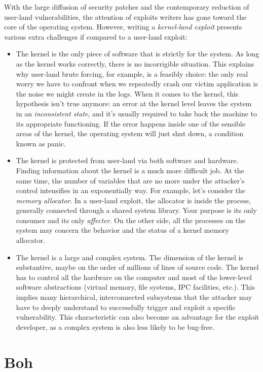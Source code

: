 \documentclass{masterthesis}
\begin{document}
With the large diffusion of security patches and the contemporary reduction of user-land vulnerabilities, the attention of exploits writers has gone toward the core of the operating system.
However, writing a \emph{kernel-land exploit} presents various extra challenges if compared to a user-land exploit:
\begin{itemize}
\item The kernel is the only piece of software that is strictly for the system. As long as the kernel works correctly, there is no incorrigible situation.
This explains why user-land brute forcing, for example, is a feasibly choice: the only real worry we have to confront when we repeatedly crash our victim application is the noise we might create in the logs. 
When it comes to the kernel, this hypothesis isn't true anymore: an error at the kernel level leaves the system in an \emph{inconsistent state}, and it's usually required to take back the machine to its appropriate functioning.
 If the error happens inside one of the sensible areas of the kernel, the operating system will just shut down, a condition known as panic.
\item The kernel is protected from user-land via both software and hardware. Finding information about the kernel is a much more difficult job. At the same time, the number of variables that are no more under the attacker’s control intensifies in an exponentially way. For example, let's consider the \emph{memory allocator}.
In a user-land exploit, the allocator is inside the process, generally connected through a shared system library. Your purpose is its only consumer and its only \emph{affecter}. On the other side, all the processes on the system may concern the behavior and the status of a kernel memory allocator.
\item The kernel is a large and complex system. The dimension of the kernel is substantive, maybe on the order of millions of lines of source code. The kernel has to control all the hardware on the computer and most of the lower-level software
abstractions (virtual memory, file systems, IPC facilities, etc.). This implies many hierarchical, interconnected subsystems that the attacker may have to deeply understand to successfully trigger and exploit a specific
vulnerability. This characteristic can also become an advantage for the exploit developer, as a complex system is also less likely to be bug-free.
\end{itemize}

\chapter{Boh}
\label{ch:boh}
\end{document}
